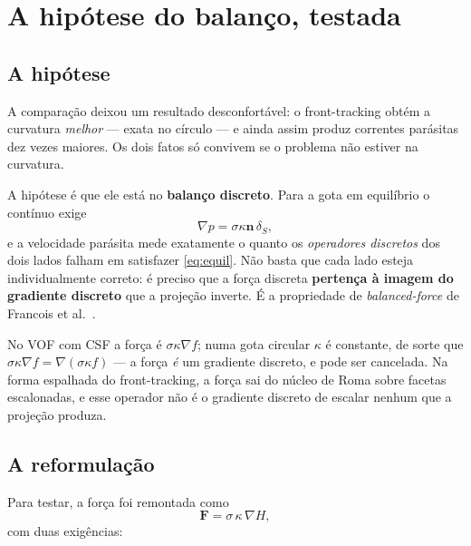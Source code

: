 \section{A hip\'otese do balan\c{c}o, testada}
\label{sec:balanco}

\subsection{A hip\'otese}

A compara\c{c}\~ao deixou um resultado desconfort\'avel: o front-tracking obt\'em
a curvatura \emph{melhor} --- exata no c\'irculo --- e ainda assim produz
correntes par\'asitas dez vezes maiores. Os dois fatos s\'o convivem se o
problema n\~ao estiver na curvatura.

A hip\'otese \'e que ele est\'a no \textbf{balan\c{c}o discreto}. Para a gota em
equil\'ibrio o cont\'inuo exige
\begin{equation}
  \nabla p = \sigma\kappa\mathbf{n}\,\delta_S,
  \label{eq:equil}
\end{equation}
e a velocidade par\'asita mede exatamente o quanto os \emph{operadores
discretos} dos dois lados falham em satisfazer \eqref{eq:equil}. N\~ao basta que
cada lado esteja individualmente correto: \'e preciso que a for\c{c}a discreta
\textbf{perten\c{c}a \`a imagem do gradiente discreto} que a proje\c{c}\~ao
inverte. \'E a propriedade de \emph{balanced-force} de Francois et
al.~\cite{francois2006}.

No VOF com CSF a for\c{c}a \'e $\sigma\kappa\nabla f$; numa gota circular $\kappa$
\'e constante, de sorte que $\sigma\kappa\nabla f = \nabla(\sigma\kappa f)$ ---
a for\c{c}a \emph{\'e} um gradiente discreto, e pode ser cancelada. Na forma
espalhada do front-tracking, a for\c{c}a sai do n\'ucleo de Roma sobre facetas
escalonadas, e esse operador n\~ao \'e o gradiente discreto de escalar nenhum que
a proje\c{c}\~ao produza.

\subsection{A reformula\c{c}\~ao}

Para testar, a for\c{c}a foi remontada como
\begin{equation}
  \mathbf{F} = \sigma\,\kappa\,\nabla H,
  \label{eq:balanceada}
\end{equation}
com duas exig\^encias:

